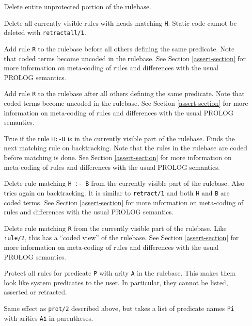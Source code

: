 \begin{description}
Delete entire unprotected portion of the rulebase.

Delete all currently visible rules with heads matching {\tt H}.
Static code cannot be deleted with {\tt retractall/1}.

Add rule {\tt R} to the rulebase before all others defining 
the same predicate.  
Note that coded terms become uncoded in the rulebase.
See Section \ref{assert-section} for more information on meta-coding
of rules and differences with the usual PROLOG semantics.

Add rule {\tt R} to the rulebase after all others defining the same predicate.
Note that coded terms become uncoded in the rulebase.
See Section \ref{assert-section} for more information on meta-coding
of rules and differences with the usual PROLOG semantics.

True if the rule {\tt H:-B} is in the currently visible part of the rulebase.
Finds the next matching rule on backtracking.  
Note that the rules in the rulebase are coded before
matching is done.
See Section \ref{assert-section} for more information on meta-coding
of rules and differences with the usual PROLOG semantics.

Delete rule matching {\tt H :- B} from the currently visible part of the
rulebase. Also tries again on backtracking.
It is similar to {\tt retract/1} and both {\tt H} and {\tt B} are
coded terms.
See Section \ref{assert-section} for more information on meta-coding
of rules and differences with the usual PROLOG semantics.

Delete rule matching {\tt R} from the currently visible part of the rulebase.
Like {\tt rule/2}, this has a ``coded view'' of the rulebase.
See Section \ref{assert-section} for more information on meta-coding
of rules and differences with the usual PROLOG semantics.

Protect all rules for predicate {\tt P} with arity {\tt A} in the rulebase.
This makes them look like system predicates to the user. In particular, they
cannot be listed, asserted or retracted.

Same effect as {\tt prot/2} described above, but takes a list of predicate
names {\tt Pi} with arities {\tt Ai} in parentheses.

\end{description}

